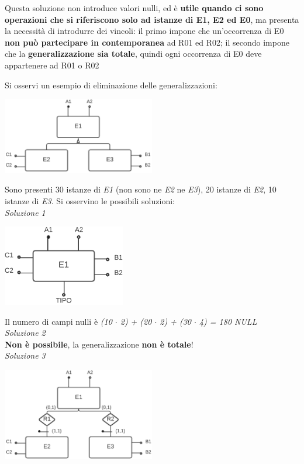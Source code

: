 \documentclass{article}
\begin{document}
\begin{itemize}[label={-}, leftmargin=1cm]
\begin{center}
    \end{center}
    Questa soluzione non introduce valori nulli, ed è \textbf{utile quando ci sono operazioni che si riferiscono solo ad istanze di E1, E2 ed E0}, ma presenta la necessità di introdurre dei vincoli: il primo impone che un'occorrenza di E0 \textbf{non può partecipare in contemporanea} ad R01 ed R02; il secondo impone che la \textbf{generalizzazione sia totale}, quindi ogni occorrenza di E0 deve appartenere ad R01 o R02\\
\end{itemize}
Si osservi un esempio di eliminazione delle generalizzazioni:
\begin{center}
    \includegraphics[width=0.5\textwidth]{esempio1.png}
\end{center}
Sono presenti 30 istanze di \textit{E1} (non sono ne \textit{E2} ne \textit{E3}), 20 istanze di \textit{E2}, 10 istanze di \textit{E3}. Si osservino le possibili soluzioni:\vspace{90pt}\\
\textit{Soluzione 1}
\begin{center}
    \includegraphics[width=0.4\textwidth]{esempio2.png}
\end{center}
Il numero di campi nulli è \textit{(10 $\cdot$ 2) + (20 $\cdot$ 2) + (30 $\cdot$ 4) = 180 NULL}\vspace{14pt}\\
\textit{Soluzione 2}\\
\textbf{Non è possibile}, la generalizzazione \textbf{non è totale}!\vspace*{14pt}\\
\textit{Soluzione 3}
\begin{center}
    \includegraphics[width=0.5\textwidth]{esempio3.png}
\end{center}
\end{document}
